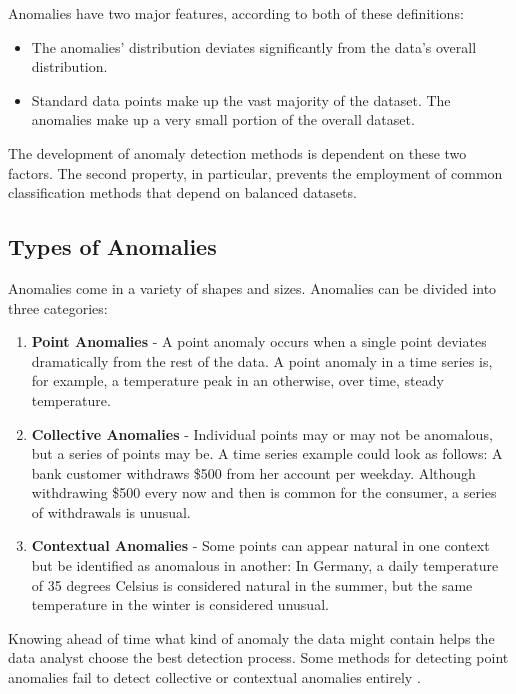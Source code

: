 Anomalies have two major features, according to both of these definitions:

\begin{itemize}
	\item The anomalies' distribution deviates significantly from the data's overall distribution.
	\item Standard data points make up the vast majority of the dataset. The anomalies make up a very small portion of the overall dataset.
\end{itemize}

The development of anomaly detection methods is dependent on these two factors. The second property, in particular, prevents the employment of common classification methods that depend on balanced datasets.

\subsection{Types of Anomalies}
Anomalies come in a variety of shapes and sizes. Anomalies can be divided into three categories:

\begin{enumerate}
	\item \textbf{Point Anomalies} - A point anomaly occurs when a single point deviates dramatically from the rest of the data.
	A point anomaly in a time series is, for example, a temperature peak in an otherwise, over time, steady temperature.
	\item \textbf{Collective Anomalies} - Individual points may or may not be anomalous, but a series of points may be. A time series example could look as follows: A bank customer withdraws \$500 from her account per weekday. Although withdrawing \$500 every now and then is common for the consumer, a series of withdrawals is unusual.
	\item \textbf{Contextual Anomalies} - Some points can appear natural in one context but be identified as anomalous in another: In Germany, a daily temperature of 35 degrees Celsius is considered natural in the summer, but the same temperature in the winter is considered unusual.
\end{enumerate}

Knowing ahead of time what kind of anomaly the data might contain helps the data analyst choose the best detection process. Some methods for detecting point anomalies fail to detect collective or contextual anomalies entirely \parencite{Braei2020}. 

